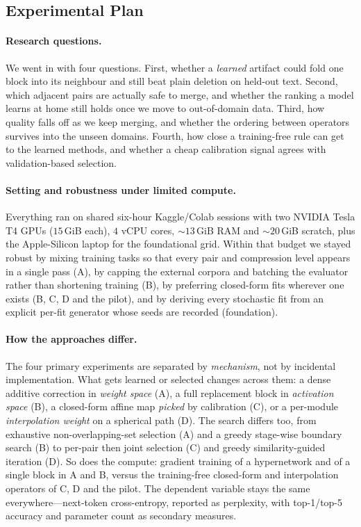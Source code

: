 \documentclass[10pt,a4paper]{article}
\begin{document}
\subsection{Experimental Plan}
\label{sec:plan}

\paragraph{Research questions.}
We went in with four questions. First, whether a \emph{learned} artifact could
fold one block into its neighbour and still beat plain deletion on held-out
text. Second, which adjacent pairs are actually safe to merge, and whether the
ranking a model learns at home still holds once we move to out-of-domain data.
Third, how quality falls off as we keep merging, and whether the ordering
between operators survives into the unseen domains. Fourth, how close a
training-free rule can get to the learned methods, and whether a cheap
calibration signal agrees with validation-based selection.

\paragraph{Setting and robustness under limited compute.} Everything ran on shared
six-hour Kaggle/Colab sessions with two NVIDIA Tesla T4 GPUs ($15$\,GiB each),
$4$ vCPU cores, ${\sim}13$\,GiB RAM and ${\sim}20$\,GiB scratch, plus the
Apple-Silicon laptop for the foundational grid. Within that budget we stayed
robust by mixing training tasks so that every pair and compression level
appears in a single pass (A), by capping the external corpora and batching the
evaluator rather than shortening training (B), by preferring closed-form fits
wherever one exists (B, C, D and the pilot), and by deriving every stochastic
fit from an explicit per-fit generator whose seeds are recorded
(foundation).

\paragraph{How the approaches differ.} The four primary experiments are
separated by \emph{mechanism}, not by incidental implementation. What gets
learned or selected changes across them: a dense additive correction in
\emph{weight space} (A), a full replacement block in \emph{activation space}
(B), a closed-form affine map \emph{picked} by calibration (C), or a per-module
\emph{interpolation weight} on a spherical path (D). The search differs too,
from exhaustive non-overlapping-set selection (A) and a greedy stage-wise
boundary search (B) to per-pair then joint selection (C) and greedy
similarity-guided iteration (D). So does the compute: gradient training of a
hypernetwork and of a single block in A and B, versus the training-free
closed-form and interpolation operators of C, D and the pilot. The dependent
variable stays the same everywhere---next-token cross-entropy, reported as
perplexity, with top-1/top-5 accuracy and parameter count as secondary
measures.
\end{document}
